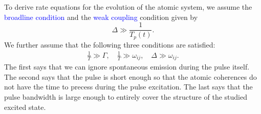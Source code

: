 \documentclass[11pt]{article}
\newcommand{\f}[2]{\frac{#1}{#2}}
\begin{document}
\begin{appendices}
To derive rate equations for the evolution of the atomic system, we assume the \textcolor{blue}{broadline condition} and the \textcolor{blue}{weak coupling} condition given by 
\begin{equation*}
\Delta \gg \f{1}{T_p(t)}. 
\end{equation*}
We further assume that the following three conditions are satisfied:
\begin{align*}
\f{1}{T} \gg \Gamma, \quad \f{1}{T} \gg \omega_{ij}, \quad \Delta \gg \omega_{ij}.
\end{align*}
The first says that we can ignore spontaneous emission during the pulse itself. The second says that the pulse is short enough so that the atomic coherences do not have the time to precess during the pulse excitation. The last says that the pulse bandwidth is large enough to entirely cover the structure of the studied excited state. 


\end{appendices}
\end{document}
